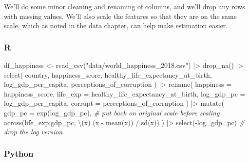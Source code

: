 \documentclass[
  letterpaper,
]{krantz}
\newenvironment{Shaded}{}{}
\newcommand{\AttributeTok}[1]{\textcolor[rgb]{0.49,0.56,0.16}{#1}}
\newcommand{\CommentTok}[1]{\textcolor[rgb]{0.38,0.63,0.69}{\textit{#1}}}
\newcommand{\FunctionTok}[1]{\textcolor[rgb]{0.02,0.16,0.49}{#1}}
\newcommand{\NormalTok}[1]{#1}
\newcommand{\OtherTok}[1]{\textcolor[rgb]{0.00,0.44,0.13}{#1}}
\newcommand{\SpecialCharTok}[1]{\textcolor[rgb]{0.25,0.44,0.63}{#1}}
\newcommand{\StringTok}[1]{\textcolor[rgb]{0.25,0.44,0.63}{#1}}
\begin{document}
We'll do some minor cleaning and renaming of columns, and we'll drop any
rows with missing values. We'll also scale the features so that they are
on the same scale, which as noted in the data chapter, can help make
estimation easier.

\subsubsection{R}

\begin{Shaded}
\begin{Highlighting}[]
\NormalTok{df\_happiness }\OtherTok{\textless{}{-}} \FunctionTok{read\_csv}\NormalTok{(}\StringTok{"data/world\_happiness\_2018.csv"}\NormalTok{) }\SpecialCharTok{|\textgreater{}}
    \FunctionTok{drop\_na}\NormalTok{() }\SpecialCharTok{|\textgreater{}}
    \FunctionTok{select}\NormalTok{(}
\NormalTok{        country,}
\NormalTok{        happiness\_score,}
\NormalTok{        healthy\_life\_expectancy\_at\_birth,}
\NormalTok{        log\_gdp\_per\_capita,}
\NormalTok{        perceptions\_of\_corruption}
\NormalTok{    ) }\SpecialCharTok{|\textgreater{}}
    \FunctionTok{rename}\NormalTok{(}
        \AttributeTok{happiness  =}\NormalTok{ happiness\_score,}
        \AttributeTok{life\_exp   =}\NormalTok{ healthy\_life\_expectancy\_at\_birth,}
        \AttributeTok{log\_gdp\_pc =}\NormalTok{ log\_gdp\_per\_capita,}
        \AttributeTok{corrupt    =}\NormalTok{ perceptions\_of\_corruption}
\NormalTok{    ) }\SpecialCharTok{|\textgreater{}}
    \FunctionTok{mutate}\NormalTok{(}
        \AttributeTok{gdp\_pc =} \FunctionTok{exp}\NormalTok{(log\_gdp\_pc), }\CommentTok{\# put back on original scale before scaling}
        \FunctionTok{across}\NormalTok{(life\_exp}\SpecialCharTok{:}\NormalTok{gdp\_pc, \textbackslash{}(x) (x }\SpecialCharTok{{-}} \FunctionTok{mean}\NormalTok{(x)) }\SpecialCharTok{/} \FunctionTok{sd}\NormalTok{(x))}
\NormalTok{    ) }\SpecialCharTok{|\textgreater{}}
    \FunctionTok{select}\NormalTok{(}\SpecialCharTok{{-}}\NormalTok{log\_gdp\_pc) }\CommentTok{\# drop the log version}
\end{Highlighting}
\end{Shaded}

\subsubsection{Python}
\end{document}
